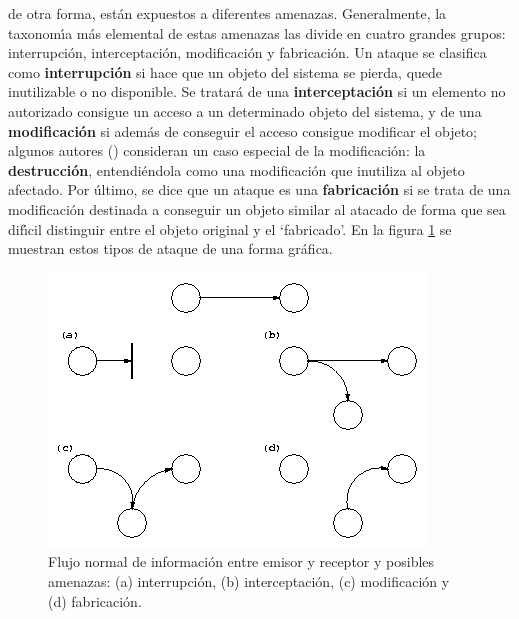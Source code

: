 de otra forma, est\'an expuestos a diferentes amenazas. Generalmente, la 
taxonom\'{\i}a m\'as elemental de estas amenazas las divide en cuatro grandes
grupos: interrupci\'on, interceptaci\'on, modificaci\'on y fabricaci\'on. 
Un ataque se clasifica como {\bf interrupci\'on} si hace que un objeto del
sistema se pierda, quede inutilizable o no disponible. Se tratar\'a de una
{\bf interceptaci\'on} si un elemento no autorizado consigue un acceso a un 
determinado objeto del sistema, y de una {\bf modificaci\'on} si adem\'as de
conseguir el acceso consigue modificar el objeto; algunos autores 
(\cite{kn:olo92}) consideran un caso especial de la modificaci\'on: la {\bf
destrucci\'on}, entendi\'endola como una modificaci\'on que inutiliza al 
objeto afectado. Por \'ultimo, se dice que un ataque es una {\bf fabricaci\'on} 
si se trata de una modificaci\'on destinada a conseguir un objeto similar al 
atacado de forma que sea dif\'{\i}cil distinguir entre el objeto original y 
el `fabricado'. En la figura \ref{ataques} se muestran estos tipos de ataque
de una forma gr\'afica.
\begin{figure}
\vspace{0.7cm}
\begin{center}
\includegraphics{attacks.png}
\end{center}
\caption{Flujo normal de informaci\'on entre emisor y receptor y posibles
amenazas: (a) inter\-rupci\'on, (b) interceptaci\'on, (c) modificaci\'on y (d) 
fabricaci\'on.}
\label{ataques}
\end{figure}
